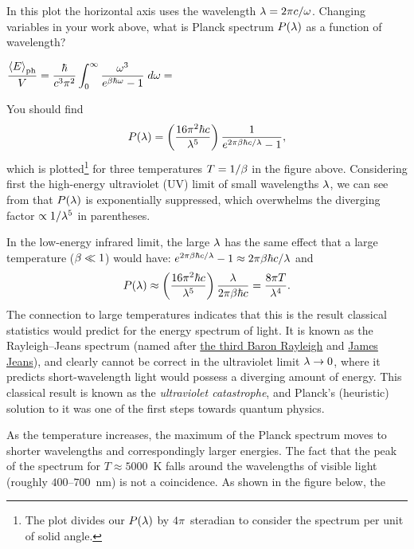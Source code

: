 In this plot the horizontal axis uses the wavelength $\lambda = 2\pi c / \omega$.
Changing variables in your work above, what is Planck spectrum $P(\lambda)$ as a function of wavelength?
\begin{mdframed}
  $\displaystyle \frac{\left\langle E \right\rangle_{\text{ph}}}{V} = \frac{\hbar}{c^3 \pi^2} \int_0^{\infty} \frac{\omega^3}{e^{\beta \hbar \omega} - 1} \; d\omega = $ \\[120 pt] %
\end{mdframed}

You should find
\begin{equation}
  \label{eq:Planck_la}
  P(\lambda) = \left(\frac{16\pi^2 \hbar c}{\lambda^5}\right) \frac{1}{e^{2\pi\beta \hbar c / \lambda} - 1},
\end{equation}
which is plotted\footnote{The plot divides our $P(\lambda)$ by $4\pi$~steradian to consider the spectrum per unit of solid angle.} for three temperatures $T = 1 / \beta$ in the figure above.
Considering first the high-energy ultraviolet (UV) limit of small wavelengths $\lambda$, we can see from  that $P(\lambda)$ is exponentially suppressed, which overwhelms the diverging factor $\propto 1 / \lambda^5$ in parentheses.

In the low-energy infrared limit, the large $\lambda$ has the same effect that a large temperature ($\beta \ll 1$) would have: $e^{2\pi\beta \hbar c / \lambda} - 1 \approx 2\pi\beta \hbar c / \lambda$ and
\begin{equation*}
  P(\lambda) \approx \left(\frac{16\pi^2 \hbar c}{\lambda^5}\right) \frac{\lambda}{2\pi\beta \hbar c} = \frac{8\pi T}{\lambda^4}.
\end{equation*}
The connection to large temperatures indicates that this is the result classical statistics would predict for the energy spectrum of light.
It is known as the Rayleigh--Jeans spectrum (named after \href{https://en.wikipedia.org/wiki/John_William_Strutt,_3rd_Baron_Rayleigh}{the third Baron Rayleigh} and \href{https://en.wikipedia.org/wiki/James_Jeans}{James Jeans}), and clearly cannot be correct in the ultraviolet limit $\lambda \to 0$, where it predicts short-wavelength light would possess a diverging amount of energy.
This classical result is known as the \textit{ultraviolet catastrophe}, and Planck's (heuristic) solution to it was one of the first steps towards quantum physics.


As the temperature increases, the maximum of the Planck spectrum moves to shorter wavelengths and correspondingly larger energies.
The fact that the peak of the spectrum for $T \approx 5000$~K falls around the wavelengths of visible light (roughly $400$--$700$~nm) is not a coincidence.
As shown in the figure below, the 

